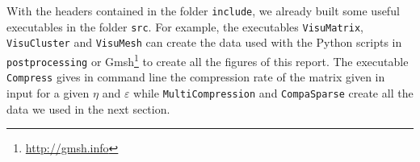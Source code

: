 With the headers contained in the folder \texttt{include}, we already built some useful executables in the folder \texttt{src}. For example, the executables \texttt{VisuMatrix}, \texttt{VisuCluster} and \texttt{VisuMesh} can create the data used with the Python scripts in \texttt{postprocessing} or Gmsh\footnote{\url{http://gmsh.info}} to create all the figures of this report. The executable \texttt{Compress} gives in command line the compression rate of the matrix given in input for a given $\eta$ and $\varepsilon$ while \texttt{MultiCompression} and \texttt{CompaSparse} create all the data we used in the next section.
